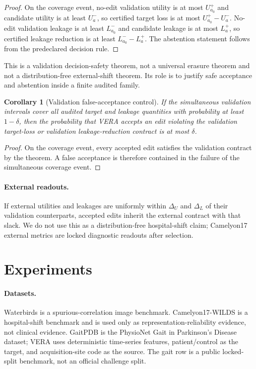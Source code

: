 \documentclass[10pt,twocolumn]{article}
\newtheorem{corollary}{Corollary}
\begin{document}
\begin{proof}
On the coverage event, no-edit validation utility is at most $U^+_{a_0}$ and
candidate utility is at least $U^-_a$, so certified target loss is at most
$U^+_{a_0}-U^-_a$. No-edit validation leakage is at least $L^-_{a_0}$ and
candidate leakage is at most $L^+_a$, so certified leakage reduction is at
least $L^-_{a_0}-L^+_a$. The abstention statement follows from the
predeclared decision rule.
\end{proof}

This is a validation decision-safety theorem, not a universal erasure theorem
and not a distribution-free external-shift theorem. Its role is to justify
safe acceptance and abstention inside a finite audited family.

\begin{corollary}[Validation false-acceptance control]
If the simultaneous validation intervals cover all audited target and leakage
quantities with probability at least $1-\delta$, then the probability that VERA
accepts an edit violating the validation target-loss or validation
leakage-reduction contract is at most $\delta$.
\end{corollary}

\begin{proof}
On the coverage event, every accepted edit satisfies the validation contract by
the theorem. A false acceptance is therefore contained in the failure of the
simultaneous coverage event.
\end{proof}

\paragraph{External readouts.}
If external utilities and leakages are uniformly within $\Delta_U$ and
$\Delta_L$ of their validation counterparts, accepted edits inherit the
external contract with that slack. We do not use this as a distribution-free
hospital-shift claim; Camelyon17 external metrics are locked diagnostic
readouts after selection.

\section{Experiments}

\paragraph{Datasets.}
Waterbirds is a spurious-correlation image benchmark. Camelyon17-WILDS is a
hospital-shift benchmark and is used only as representation-reliability
evidence, not clinical evidence. GaitPDB is the PhysioNet Gait in Parkinson's
Disease dataset; VERA uses deterministic time-series features, patient/control
as the target, and acquisition-site code as the source. The gait row is a
public locked-split benchmark, not an official challenge split.
\end{document}
